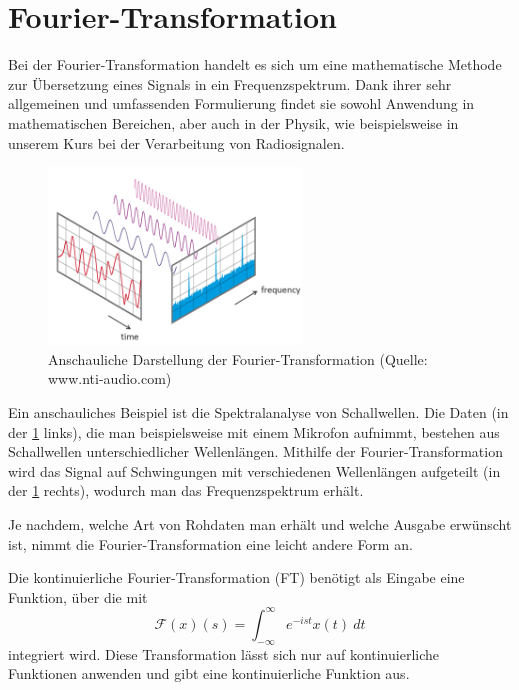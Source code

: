 \documentclass[]{dsadokumentation}
\begin{document}
\section{Fourier-Transformation}
Bei der Fourier-Transformation handelt es sich um eine mathematische Methode zur Übersetzung eines Signals in ein Frequenzspektrum. Dank ihrer sehr allgemeinen und umfassenden Formulierung findet sie sowohl Anwendung in mathematischen Bereichen, aber auch in der Physik, wie beispielsweise in unserem Kurs bei der Verarbeitung von Radiosignalen.

\begin{figure}[h]
    \centering
    \includegraphics[width=0.6\textwidth]{k4.2/fourier.png}
    \caption{Anschauliche Darstellung der Fourier-Transformation (Quelle: www.nti-audio.com)}
    \label{k4.2.fourier}
\end{figure}

Ein anschauliches Beispiel ist die Spektralanalyse von Schallwellen. Die Daten (in der \cref{k4.2.fourier} links), die man beispielsweise mit einem Mikrofon aufnimmt, bestehen aus Schallwellen unterschiedlicher Wellenlängen. Mithilfe der Fourier-Transformation wird das Signal auf Schwingungen mit verschiedenen Wellenl\"angen aufgeteilt (in der \cref{k4.2.fourier} rechts), wodurch man das Frequenzspektrum erhält.

Je nachdem, welche Art von Rohdaten man erhält und welche Ausgabe erwünscht ist, nimmt die Fourier-Transformation eine leicht andere Form an.

Die kontinuierliche Fourier-Transformation (FT) benötigt als Eingabe eine Funktion, über die mit
\begin{displaymath}
\mathcal{F}(x)(s)=\int_{-\infty}^{\infty}e^{-ist}x(t)\ dt
\end{displaymath}
integriert wird. Diese Transformation lässt sich nur auf kontinuierliche Funktionen anwenden und gibt eine kontinuierliche Funktion aus.
\end{document}
